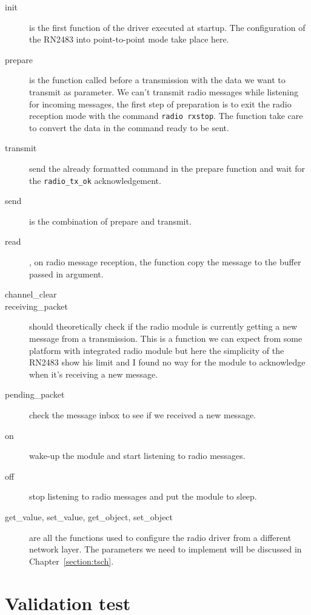 \begin{description}
  \item[init] is the first function of the driver executed at startup.
    The configuration of the RN2483 into point-to-point mode take place here.
  \item[prepare] is the function called before a transmission with the data we
    want to transmit as parameter. 
    We can't transmit radio messages while listening for incoming messages, the
    first step of preparation is to exit the radio reception mode with the
    command \lstinline{radio rxstop}.
    The function take care to convert the data in the command ready to be sent.
  \item[transmit] send the already formatted command in the prepare function and
    wait for the \lstinline{radio_tx_ok} acknowledgement.
  \item[send] is the combination of prepare and transmit.
  \item[read], on radio message reception, the function copy the 
    message to the buffer passed in argument.
  \item[channel\_clear]
  \item[receiving\_packet] should theoretically check if the radio module is
    currently getting a new message from a transmission. This is a function we
    can expect from some platform with integrated radio module but here the
    simplicity of the RN2483 show his limit and I found no way for the module
    to acknowledge when it's receiving a new message.
  \item[pending\_packet] check the message inbox to see if we received a new
    message.
  \item[on] wake-up the module and start listening to radio messages.
  \item[off] stop listening to radio messages and put the module to sleep.
  \item[get\_value, set\_value, get\_object, set\_object] are all the functions used
    to configure the radio driver from a different network layer. 
    The parameters we need to implement will be discussed in Chapter~\ref{section:tsch}.
\end{description}


\section{Validation test}

